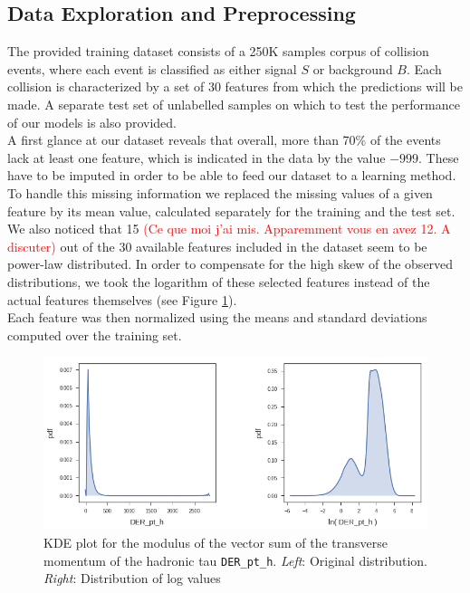 \documentclass[10pt,conference,compsocconf]{IEEEtran}
\begin{document}
\subsection{Data Exploration and Preprocessing}
The provided training dataset consists of a 250K samples corpus of collision events, where each event is classified as either signal $S$ or background $B$. Each collision is characterized by a set of 30 features from which the predictions will be made. A separate test set of unlabelled samples on which to test the performance of our models is also provided. \\
A first glance at our dataset reveals that overall,
more than 70\% of the events lack at least one feature, which is indicated in the data  by the value $-999$. These have to be imputed in order to be able to feed our dataset to a learning method. To handle this missing information we replaced the missing values of a given feature by its mean value, calculated separately for the training and the test set. \\
We also noticed that 15 \textcolor{red}{(Ce que moi j'ai mis. Apparemment vous en avez 12. A discuter) } out of the 30 available features included in the dataset seem to be power-law distributed. In order to compensate for the high skew of the observed distributions, we took the logarithm of these selected features instead of the actual features themselves (see Figure \ref{fig_kde}).\\ Each feature was then normalized using the means and standard deviations computed over the training set. 

\begin{figure}[htb]
\centering
\includegraphics[width=\linewidth]{kdeplot.png}

\cprotect\caption{KDE plot for the modulus of the vector sum of the transverse momentum of the hadronic tau \verb+DER_pt_h+.
\emph{Left}: Original distribution. \emph{Right}:  Distribution of log values}
\label{fig_kde}
\end{figure}
\end{document}
